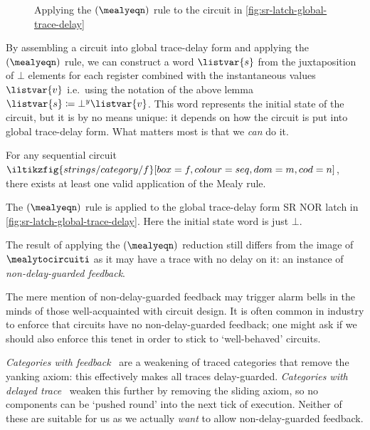 \documentclass{lmcs}
\begin{document}
\begin{figure}
    \centering
    \caption{
        Applying the \((\mealyeqn)\) rule to the circuit in
        \autoref{fig:sr-latch-global-trace-delay}
    }
    \label{fig:sr-latch-pre-mealy}
\end{figure}

By assembling a circuit into global trace-delay form and
applying the \((\mealyeqn)\) rule, we can construct a word \(\listvar{s}\)
from the juxtaposition of \(\bot\) elements for each register combined with
the instantaneous values \(\listvar{v}\) i.e.\ using the notation of the above
lemma \(\listvar{s} \coloneqq \bot^y\listvar{v}\).
This word represents the initial state of the circuit, but it is by no means
unique: it depends on how the circuit is put into global trace-delay form.
What matters most is that we \emph{can} do it.

\begin{cor}
    For any sequential circuit \(
    \iltikzfig{strings/category/f}[box=f, colour=seq, dom=m, cod=n]
    \), there exists at least one valid application of the Mealy rule.
\end{cor}

\begin{exa}
    The \((\mealyeqn)\) rule is applied to the global trace-delay form
    SR NOR latch in \autoref{fig:sr-latch-global-trace-delay}.
    Here the initial state word is just \(\bot\).
\end{exa}

The result of applying the \((\mealyeqn)\) reduction still differs from the
image of \(\mealytocircuiti\) as it may have a trace with no delay on it: an
instance of \emph{non-delay-guarded feedback}.

The mere mention of non-delay-guarded feedback may trigger alarm bells in
the minds of those well-acquainted with circuit design.
It is often common in industry to enforce that circuits have no
non-delay-guarded feedback; one might ask if we should also enforce this
tenet in order to stick to `well-behaved' circuits.

\begin{rem}
    \emph{Categories with feedback}~\cite{katis2002feedback} are a weakening of
    traced categories that remove the yanking axiom: this effectively makes all
    traces delay-guarded.
    \emph{Categories with delayed trace}~\cite{sprunger2019differentiable}
    weaken this further by removing the sliding axiom, so no components can be
    `pushed round' into the next tick of execution.
    Neither of these are suitable for us as we actually \emph{want} to allow
    non-delay-guarded feedback.
\end{rem}
\end{document}
